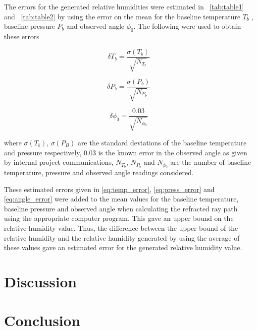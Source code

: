 \documentclass{article}
\newcommand{\tabref}[2][\tablename~]{#1\ref{#2}}
\begin{document}
\vspace{2mm}
\noindent
The errors for the generated relative humidities were estimated in \tabref{tab:table1} and \tabref{tab:table2} by using the error on the mean for the baseline temperature $T_b$ \cite{Web01}, baseline pressure $P_b$ \cite{Web01} and observed angle $\phi_0$. The following were used to obtain these errors

\begin{equation}
\label{eq:temp_error}
\delta{T_b} = \frac{\sigma{(T_b)}}{\sqrt{N_{T{_b}}}}
\end{equation}


\begin{equation}
\label{eq:press_error}
\delta{P_b} = \frac{\sigma{(P_b)}}{\sqrt{N_{P{_b}}}}
\end{equation}

\begin{equation}
\label{eq:angle_error}
\delta{\phi_0} = \frac{0.03}{\sqrt{N_{\phi{_0}}}}
\end{equation}

\vspace{2mm}
\noindent
where $\sigma{(T_b)}$, $\sigma{(P_B)}$ are the standard deviations of the baseline temperature and pressure respectively, 0.03 is the known error in the observed angle as given by internal project communications, $N_{T{_b}}$, $N_{P{_b}}$ and $N_{\phi{_0}}$ are the number of baseline temperature, pressure and observed angle readings considered. 

\vspace{2mm}
\noindent
These estimated errors given in \eqref{eq:temp_error}, \eqref{eq:press_error} and \eqref{eq:angle_error} were added to the mean values for the baseline temperature, baseline pressure and observed angle when calculating the refracted ray path using the appropriate computer program. This gave an upper bound on the relative humidity value. Thus, the difference between the upper bound of the relative humidity and the relative humidity generated by using the average of these values gave an estimated error for the generated relative humidity value.

\section{Discussion}
\label{sec:discussion}



\section{Conclusion}
\label{sec:conclusion}
\end{document}
